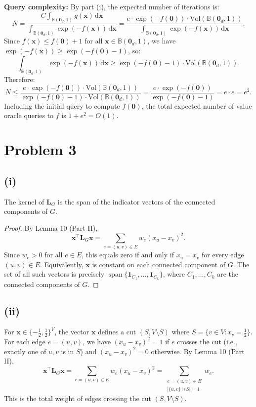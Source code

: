 \documentclass[12pt]{article}
\begin{document}
\textbf{Query complexity:} By part (i), the expected number of iterations is:
\[
N = \frac{C \int_{\mathbb{B}(\mathbf{0}_d,1)} g(\mathbf{x})\,\mathrm{d}\mathbf{x}}{\int_{\mathbb{B}(\mathbf{0}_d,1)} \exp(-f(\mathbf{x}))\,\mathrm{d}\mathbf{x}} = \frac{e \cdot \exp(-f(\mathbf{0})) \cdot \mathrm{Vol}(\mathbb{B}(\mathbf{0}_d,1))}{\int_{\mathbb{B}(\mathbf{0}_d,1)} \exp(-f(\mathbf{x}))\,\mathrm{d}\mathbf{x}}.
\]
Since $f(\mathbf{x}) \leq f(\mathbf{0}) + 1$ for all $\mathbf{x} \in \mathbb{B}(\mathbf{0}_d,1)$, we have $\exp(-f(\mathbf{x})) \geq \exp(-f(\mathbf{0}) - 1)$, so:
\[
\int_{\mathbb{B}(\mathbf{0}_d,1)} \exp(-f(\mathbf{x}))\,\mathrm{d}\mathbf{x} \geq \exp(-f(\mathbf{0}) - 1) \cdot \mathrm{Vol}(\mathbb{B}(\mathbf{0}_d,1)).
\]
Therefore:
\[
N \leq \frac{e \cdot \exp(-f(\mathbf{0})) \cdot \mathrm{Vol}(\mathbb{B}(\mathbf{0}_d,1))}{\exp(-f(\mathbf{0}) - 1) \cdot \mathrm{Vol}(\mathbb{B}(\mathbf{0}_d,1))} = \frac{e \cdot \exp(-f(\mathbf{0}))}{\exp(-f(\mathbf{0}) - 1)} = e \cdot e = e^2.
\]
Including the initial query to compute $f(\mathbf{0})$, the total expected number of value oracle queries to $f$ is $1 + e^2 = O(1)$.

\section*{Problem 3}

\subsection*{(i)}
The kernel of $\mathbf{L}_G$ is the span of the indicator vectors of the connected components of $G$.

\begin{proof}
By Lemma 10 (Part II),
\[
\mathbf{x}^\top \mathbf{L}_G \mathbf{x} = \sum_{e = (u,v) \in E} w_e (x_u - x_v)^2.
\]
Since $w_e > 0$ for all $e \in E$, this equals zero if and only if $x_u = x_v$ for every edge $(u, v) \in E$. Equivalently, $\mathbf{x}$ is constant on each connected component of $G$. The set of all such vectors is precisely $\operatorname{span}\{\mathbf{1}_{C_1}, \ldots, \mathbf{1}_{C_k}\}$, where $C_1, \ldots, C_k$ are the connected components of $G$.
\end{proof}

\subsection*{(ii)}
For $\mathbf{x} \in \{-\tfrac{1}{2}, \tfrac{1}{2}\}^V$, the vector $\mathbf{x}$ defines a cut $(S, V \setminus S)$ where $S = \{v \in V : x_v = \tfrac{1}{2}\}$. For each edge $e = (u,v)$, we have $(x_u - x_v)^2 = 1$ if $e$ crosses the cut (i.e., exactly one of $u, v$ is in $S$) and $(x_u - x_v)^2 = 0$ otherwise. By Lemma 10 (Part II),
\[
\mathbf{x}^\top \mathbf{L}_G \mathbf{x} = \sum_{e = (u,v) \in E} w_e (x_u - x_v)^2 = \sum_{\substack{e = (u,v) \in E \\ |\{u,v\} \cap S| = 1}} w_e.
\]
This is the total weight of edges crossing the cut $(S, V \setminus S)$.
\end{document}
